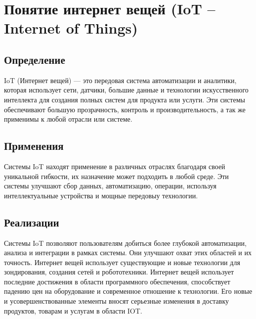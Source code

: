 \section{Понятие интернет вещей (IoT – Internet of Things)}

\subsection{Определение}
IoT (Интернет вещей) — это передовая система автоматизации и аналитики, которая использует
сети, датчики, большие данные и технологии искусственного интеллекта для создания полных систем
для продукта или услуги\cite{IoT}. Эти системы обеспечивают большую прозрачность, контроль и производительность, а так же применимы к любой отрасли или системе.

\subsection{Применения}
Системы IoT находят применение в различных отраслях благодаря своей уникальной гибкости, их назначение может
подходить в любой среде. Эти системы улучшают сбор данных, автоматизацию, операции, используя
интеллектуальные устройства и мощные передовыу технологии.

\subsection{Реализации}
Системы IoT позволяют пользователям добиться более глубокой автоматизации, анализа и интеграции в рамках системы.
Они улучшают охват этих областей и их точность. Интернет вещей использует существующие и новые
технологии для зондирования, создания сетей и робототехники.
Интернет вещей использует последние достижения в области программного обеспечения, способствует падению цен на оборудование и современное отношение к
технологии. Его новые и усовершенствованные элементы вносят серьезные изменения в доставку продуктов,
товарам и услугам в области IOT.